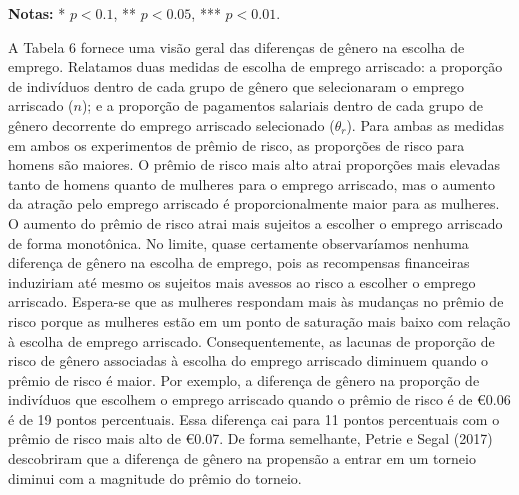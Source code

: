 \documentclass[a4paper,12pt]{article}[abntex2]
\begin{document}
\begin{table}[h!]
\centering
\caption{Diferenças de Gênero nas Escolhas de Emprego.}
\textbf{Notas:} * \( p < 0.1 \), ** \( p < 0.05 \), *** \( p < 0.01 \).
\end{table}

A Tabela 6 fornece uma visão geral das diferenças de gênero na escolha de emprego. Relatamos duas medidas de escolha de emprego arriscado: a proporção de indivíduos dentro de cada grupo de gênero que selecionaram o emprego arriscado (\(n\)); e a proporção de pagamentos salariais dentro de cada grupo de gênero decorrente do emprego arriscado selecionado (\(\theta_r\)). Para ambas as medidas em ambos os experimentos de prêmio de risco, as proporções de risco para homens são maiores. O prêmio de risco mais alto atrai proporções mais elevadas tanto de homens quanto de mulheres para o emprego arriscado, mas o aumento da atração pelo emprego arriscado é proporcionalmente maior para as mulheres. O aumento do prêmio de risco atrai mais sujeitos a escolher o emprego arriscado de forma monotônica. No limite, quase certamente observaríamos nenhuma diferença de gênero na escolha de emprego, pois as recompensas financeiras induziriam até mesmo os sujeitos mais avessos ao risco a escolher o emprego arriscado. Espera-se que as mulheres respondam mais às mudanças no prêmio de risco porque as mulheres estão em um ponto de saturação mais baixo com relação à escolha de emprego arriscado. Consequentemente, as lacunas de proporção de risco de gênero associadas à escolha do emprego arriscado diminuem quando o prêmio de risco é maior. Por exemplo, a diferença de gênero na proporção de indivíduos que escolhem o emprego arriscado quando o prêmio de risco é de €0.06 é de 19 pontos percentuais. Essa diferença cai para 11 pontos percentuais com o prêmio de risco mais alto de €0.07. De forma semelhante, Petrie e Segal (2017) descobriram que a diferença de gênero na propensão a entrar em um torneio diminui com a magnitude do prêmio do torneio.
\end{document}
